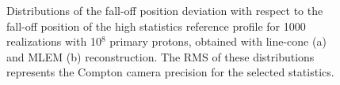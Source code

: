 \begin{figure}
  \centering
  \caption{Distributions of the fall-off position deviation with respect to the fall-off position of the high statistics reference profile for 1000 realizations with 10$^8$ primary protons, obtained with line-cone (a) and MLEM (b) reconstruction. The RMS of these distributions represents the Compton camera precision for the selected statistics.}\end{figure}


